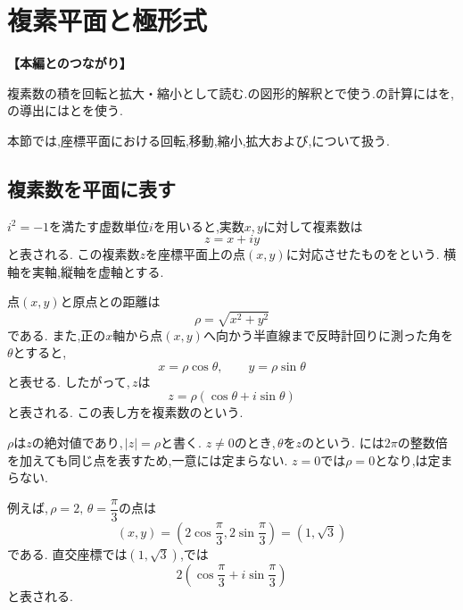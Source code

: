 
\section{複素平面と極形式}\label{節：極形式と複素平面}
  \noindent\textbf{【本編とのつながり】}\par
  複素数の積を回転と拡大・縮小として読む.の図形的解釈とで使う.の計算にはを,の導出にはとを使う.

本節では,座標平面における回転,移動,縮小,拡大および,について扱う.

  \subsection{複素数を平面に表す}\label{節：複素平面と極形式}

    $i^2=-1$を満たす虚数単位$i$を用いると,実数$x,y$に対して複素数は
    \[
      z=x+iy
    \]
    と表される.
    この複素数$z$を座標平面上の点$(x,y)$に対応させたものをという.
    横軸を実軸,縦軸を虚軸とする.

    点$(x,y)$と原点との距離は
    \[
      \rho=\sqrt{x^2+y^2}
    \]
    である.
    また,正の$x$軸から点$(x,y)$へ向かう半直線まで反時計回りに測った角を$\theta$とすると,
    \[
      x=\rho\cos\theta,\qquad
      y=\rho\sin\theta
    \]
    と表せる.
    したがって,\,$z$は
    \[
      z=\rho(\cos\theta+i\sin\theta)
    \]
    と表される.
    この表し方を複素数のという.

    $\rho$は$z$の絶対値であり,\,$|z|=\rho$と書く.
    $z\ne0$のとき,\,$\theta$を$z$のという.
    には$2\pi$の整数倍を加えても同じ点を表すため,一意には定まらない.
    $z=0$では$\rho=0$となり,は定まらない.
  \BookFigPolar

    例えば,\,$\rho=2,\,\theta=\dfrac{\pi}{3}$の点は
    \[
      (x,y)
      =
      \left(
        2\cos\frac{\pi}{3},
        2\sin\frac{\pi}{3}
      \right)
      =
      (1,\sqrt{3})
    \]
    である.
    直交座標では$(1,\sqrt{3})$,では
    \[
      2\left(
        \cos\frac{\pi}{3}
        +i\sin\frac{\pi}{3}
      \right)
    \]
    と表される.

